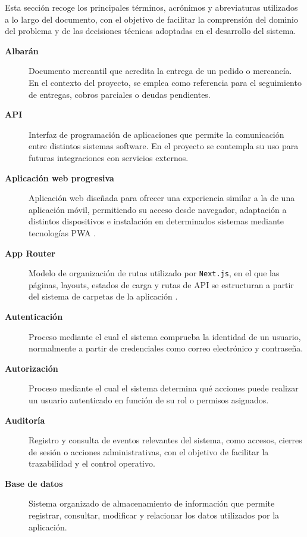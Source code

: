 Esta sección recoge los principales términos, acrónimos y abreviaturas utilizados a lo largo del documento, con el objetivo de facilitar la comprensión del dominio del problema y de las decisiones técnicas adoptadas en el desarrollo del sistema.
\begin{description}

\item[\textbf{Albarán}]
Documento mercantil que acredita la entrega de un pedido o mercancía. En el contexto del proyecto, se emplea como referencia para el seguimiento de entregas, cobros parciales o deudas pendientes.

\item[\textbf{API}]
Interfaz de programación de aplicaciones que permite la comunicación entre distintos sistemas software. En el proyecto se contempla su uso para futuras integraciones con servicios externos.

\item[\textbf{Aplicación web progresiva}]
Aplicación web diseñada para ofrecer una experiencia similar a la de una aplicación móvil, permitiendo su acceso desde navegador, adaptación a distintos dispositivos e instalación en determinados sistemas mediante tecnologías PWA \citep{webdev-pwa}.

\item[\textbf{App Router}]
Modelo de organización de rutas utilizado por \texttt{Next.js}, en el que las páginas, layouts, estados de carga y rutas de API se estructuran a partir del sistema de carpetas de la aplicación \citep{nextjsdocs2026,nextjsroutehandlers2026}.

\item[\textbf{Autenticación}]
Proceso mediante el cual el sistema comprueba la identidad de un usuario, normalmente a partir de credenciales como correo electrónico y contraseña.

\item[\textbf{Autorización}]
Proceso mediante el cual el sistema determina qué acciones puede realizar un usuario autenticado en función de su rol o permisos asignados.

\item[\textbf{Auditoría}]
Registro y consulta de eventos relevantes del sistema, como accesos, cierres de sesión o acciones administrativas, con el objetivo de facilitar la trazabilidad y el control operativo.

\item[\textbf{Base de datos}]
Sistema organizado de almacenamiento de información que permite registrar, consultar, modificar y relacionar los datos utilizados por la aplicación.


\end{description}
